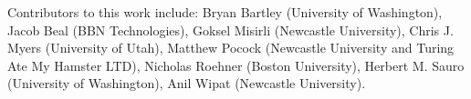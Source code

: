 
Contributors to this work include: Bryan Bartley (University of Washington), Jacob Beal (BBN Technologies), Goksel Misirli (Newcastle University), Chris J. Myers (University of Utah), Matthew Pocock (Newcastle University and Turing Ate My Hamster LTD), Nicholas Roehner (Boston University), Herbert M. Sauro (University of Washington), Anil Wipat (Newcastle University).

